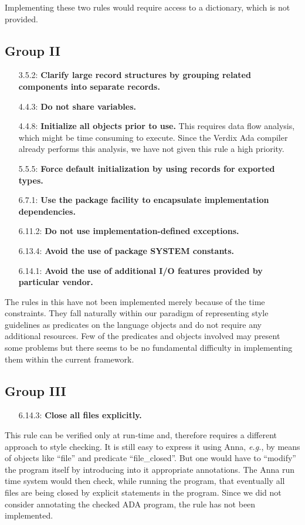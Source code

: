 Implementing these two rules would require access to a dictionary, which is not provided.

\subsection*{Group II}

\begin{itemize}
\item [3.5.2:] {\bf Clarify large record structures by grouping related components 
into separate records.}
\item [4.4.3:] {\bf Do not share variables.}
\item [4.4.8:] {\bf Initialize all objects prior to use.} This requires data flow
analysis, which might be time consuming to execute. Since the Verdix Ada compiler
already performs this analysis, we have not given this rule a high priority.
\item [5.5.5:] {\bf Force default initialization by using records for exported 
types.}
\item [6.7.1:] {\bf Use the package facility to encapsulate implementation
dependencies.}

\item [6.11.2:] {\bf Do not use implementation-defined exceptions.}
\item [6.13.4:] {\bf Avoid the use of package SYSTEM constants.}
\item [6.14.1:] {\bf Avoid the use of additional I/O features provided by 
particular vendor.}
\end{itemize}

The rules in this  have not been implemented merely because of the time constraints. They fall naturally within our paradigm of representing 
style guidelines as predicates on the language objects and do not require 
any additional resources. Few of the predicates and objects involved may 
present some problems but  there seems to be no fundamental difficulty in 
implementing them within the current framework.

\subsection*{Group III}

\begin{itemize}
\item [6.14.3:] {\bf Close all files explicitly.}
\end{itemize}

This rule can be verified only at run-time and, therefore requires a 
different approach to style checking. It is still easy to express it using 
Anna, {\em e.g.}, by means of objects like ``file'' and predicate ``file\_closed''. But 
one would have to ``modify'' the program itself by introducing into it 
appropriate annotations. The Anna run time system would then check, while 
running the program, that eventually all files are being closed by explicit 
statements in the program. Since we did not consider annotating the checked 
ADA program, the rule has not been implemented.


